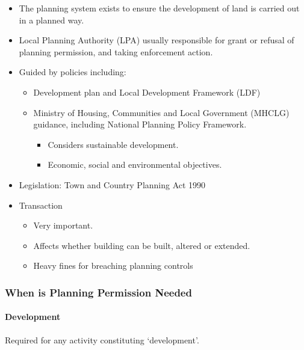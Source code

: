 \documentclass[
]{article}
\providecommand{\tightlist}{%
  \setlength{\itemsep}{0pt}\setlength{\parskip}{0pt}}
\begin{document}
\begin{itemize}
\tightlist
\item
  The planning system exists to ensure the development of land is
  carried out in a planned way.
\item
  Local Planning Authority (LPA) usually responsible for grant or
  refusal of planning permission, and taking enforcement action.
\item
  Guided by policies including:

  \begin{itemize}
  \tightlist
  \item
    Development plan and Local Development Framework (LDF)
  \item
    Ministry of Housing, Communities and Local Government (MHCLG)
    guidance, including National Planning Policy Framework.

    \begin{itemize}
    \tightlist
    \item
      Considers sustainable development.
    \item
      Economic, social and environmental objectives.
    \end{itemize}
  \end{itemize}
\item
  Legislation: Town and Country Planning Act 1990
\item
  Transaction

  \begin{itemize}
  \tightlist
  \item
    Very important.
  \item
    Affects whether building can be built, altered or extended.
  \item
    Heavy fines for breaching planning controls
  \end{itemize}
\end{itemize}

\hypertarget{when-is-planning-permission-needed}{%
\subsubsection{When is Planning Permission
Needed}\label{when-is-planning-permission-needed}}

\hypertarget{development}{%
\paragraph{Development}\label{development}}

Required for any activity constituting `development'.
\end{document}
